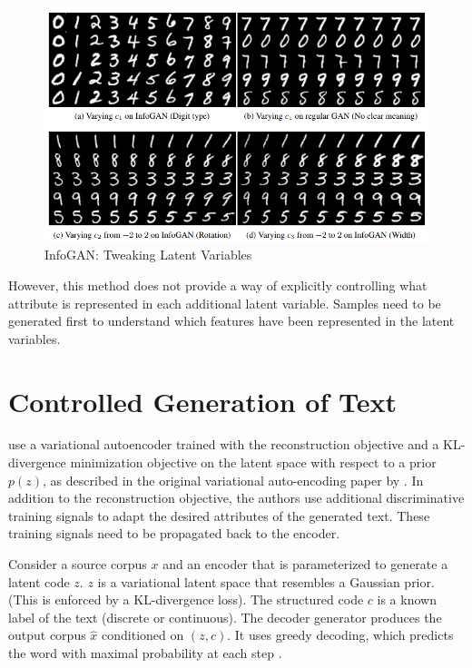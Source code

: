 \begin{figure}[ht]
	\centering
	\includegraphics[width=\textwidth]{images/infogan-digits}
	\caption{\label{fig:infogan-digits} InfoGAN: Tweaking Latent Variables}
\end{figure}

However, this method does not provide a way of explicitly controlling what attribute is represented in each additional latent variable. Samples need to be generated first to understand which features have been represented in the latent variables.


\section{Controlled Generation of Text}

\cite{hu2017toward} use a variational autoencoder trained with the reconstruction objective and a KL-divergence minimization objective on the latent space with respect to a prior $p(z)$, as described in the original variational auto-encoding paper by \cite{kingma2013auto}. In addition to the reconstruction objective, the authors use additional discriminative training signals to adapt the desired attributes of the generated text. These training signals need to be propagated back to the encoder.

Consider a source corpus $x$ and an encoder that is parameterized to generate a latent code $z$. $z$ is a variational latent space that resembles a Gaussian prior. (This is enforced by a KL-divergence loss). The structured code $c$ is a known label of the text (discrete or continuous). The decoder generator produces the output corpus $\hat{x}$ conditioned on $(z, c)$. It uses greedy decoding, which predicts the word with maximal probability at each step \citep{langlais2007greedy}.

